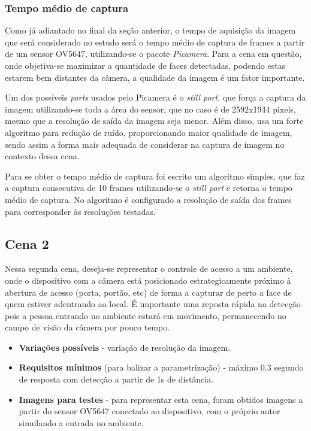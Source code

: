 \subsubsection{Tempo médio de captura}
Como já adiantado no final da seção anterior, o tempo de aquisição da imagem que será considerado no estudo será o tempo médio de captura de frames a partir de um sensor OV5647, utilizando-se o pacote \emph{Picamera}. Para a cena em questão, onde objetiva-se maximizar a quantidade de faces detectadas, podendo estas estarem bem distantes da câmera, a qualidade da imagem é um fator importante.

Um dos possíveis \emph{ports} usados pelo Picamera é o \emph{still port}, que força a captura da imagem utilizando-se toda a área do sensor, que no caso é de 2592x1944 pixels, mesmo que a resolução de saída da imagem seja menor. Além disso, usa um forte algoritmo para redução de ruído, proporcionando maior qualidade de imagem, sendo assim a forma mais adequada de considerar na captura de imagem no contexto dessa cena.

Para se obter o tempo médio de captura foi escrito um algoritmo simples, que faz a captura consecutiva de 10 frames utilizando-se o \emph{still port} e retorna o tempo médio de captura. No algoritmo é configurado a resolução de saída dos frames para corresponder às resoluções testadas.

\subsection{Cena 2}

Nessa segunda cena, deseja-se representar o controle de acesso a um ambiente, onde o dispositivo com a câmera está posicionado estrategicamente próximo à abertura de acesso (porta, portão, etc) de forma a capturar de perto a face de quem estiver adentrando ao local. É importante uma reposta rápida na detecção pois a pessoa entrando no ambiente estará em movimento, permanecendo no campo de visão da câmera por pouco tempo.

\begin{itemize}
    \item \textbf{Variações possíveis} - variação de resolução da imagem.
    \item \textbf{Requisitos mínimos} (para balizar a parametrização) - máximo 0.3 segundo de resposta com detecção a partir de 1s de distância.
    \item \textbf{Imagens para testes} - para representar esta cena, foram obtidos imagens a partir do sensor OV5647 conectado ao dispositivo, com o próprio autor simulando a entrada no ambiente.
    \end{itemize}

